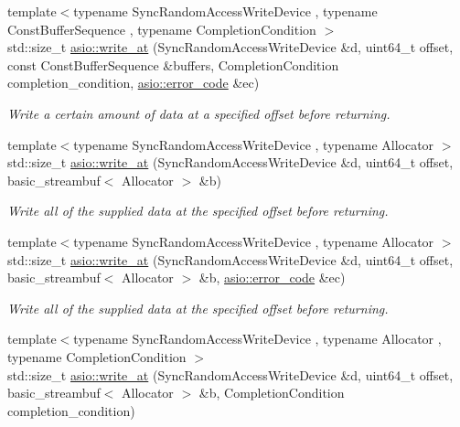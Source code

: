 \begin{DoxyCompactItemize}
{\footnotesize template$<$typename Sync\+Random\+Access\+Write\+Device , typename Const\+Buffer\+Sequence , typename Completion\+Condition $>$ }\\std\+::size\+\_\+t \hyperlink{group__write__at_ga51133c1e260b8abeeed55646e765fdd6}{asio\+::write\+\_\+at} (Sync\+Random\+Access\+Write\+Device \&d, uint64\+\_\+t offset, const Const\+Buffer\+Sequence \&buffers, Completion\+Condition completion\+\_\+condition, \hyperlink{classasio_1_1error__code}{asio\+::error\+\_\+code} \&ec)
\begin{DoxyCompactList}\small\item\em Write a certain amount of data at a specified offset before returning. \end{DoxyCompactList}\item 
{\footnotesize template$<$typename Sync\+Random\+Access\+Write\+Device , typename Allocator $>$ }\\std\+::size\+\_\+t \hyperlink{group__write__at_ga1db1f75a907c17918092b41f2f242104}{asio\+::write\+\_\+at} (Sync\+Random\+Access\+Write\+Device \&d, uint64\+\_\+t offset, basic\+\_\+streambuf$<$ Allocator $>$ \&b)
\begin{DoxyCompactList}\small\item\em Write all of the supplied data at the specified offset before returning. \end{DoxyCompactList}\item 
{\footnotesize template$<$typename Sync\+Random\+Access\+Write\+Device , typename Allocator $>$ }\\std\+::size\+\_\+t \hyperlink{group__write__at_gaa6f42435acf937c35ee4c81af44ee6ce}{asio\+::write\+\_\+at} (Sync\+Random\+Access\+Write\+Device \&d, uint64\+\_\+t offset, basic\+\_\+streambuf$<$ Allocator $>$ \&b, \hyperlink{classasio_1_1error__code}{asio\+::error\+\_\+code} \&ec)
\begin{DoxyCompactList}\small\item\em Write all of the supplied data at the specified offset before returning. \end{DoxyCompactList}\item 
{\footnotesize template$<$typename Sync\+Random\+Access\+Write\+Device , typename Allocator , typename Completion\+Condition $>$ }\\std\+::size\+\_\+t \hyperlink{group__write__at_ga2e23f5418309ba130d75f6757b7b8e15}{asio\+::write\+\_\+at} (Sync\+Random\+Access\+Write\+Device \&d, uint64\+\_\+t offset, basic\+\_\+streambuf$<$ Allocator $>$ \&b, Completion\+Condition completion\+\_\+condition)

\end{DoxyCompactItemize}
